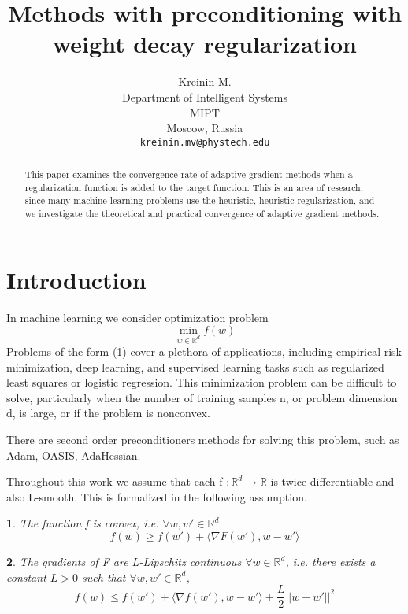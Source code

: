 \documentclass{article}
\title{Methods with preconditioning with weight decay regularization}
\author{ Kreinin M. \\
	Department of Intelligent Systems\\
	MIPT\\
	Moscow, Russia \\
	\texttt{kreinin.mv@phystech.edu} \\
}
\date{}
\makeatletter
\newtheorem*{assumption*}{\assumptionnumber}
\providecommand{\assumptionnumber}{}
\newenvironment{assumption}[2]
 {%
  \renewcommand{\assumptionnumber}{\textbf{Assumption} #1 ({#2})}%
  \begin{assumption*}%
  \protected@edef\@currentlabel{#1-#2}%
 }
 {%
  \end{assumption*}
 }
\makeatother
\begin{document}
\maketitle

\begin{abstract}
	This paper examines the convergence rate of adaptive gradient methods when a regularization function is added to the target function. This is an area of research, since many machine learning problems use the heuristic, heuristic regularization, and we investigate the theoretical and practical convergence of adaptive gradient methods.
\end{abstract}


\section{Introduction}
In machine learning we consider optimization problem
\begin{equation*}
	\min_{w \in \mathbb{R}^d} f(w)
\end{equation*}
Problems of the form (1) cover a plethora of applications, including empirical risk minimization,
deep learning, and supervised learning tasks such as regularized least squares or logistic regression. This minimization problem can be difficult to solve, particularly when the number of training
samples n, or problem dimension d, is large, or if the problem is nonconvex.

There are second order preconditioners methods for solving this problem, such as Adam, OASIS, AdaHessian. 

Throughout this work we assume that each f $:\mathbb{R}^d \rightarrow \mathbb{R}$ is twice differentiable and also L-smooth. This is formalized in the following assumption.

\begin{assumption}{1}{Convex}
	The function f is convex, i.e. $\forall w, w' \in \mathbb{R}^d$
	\begin{equation}
		f(w) \geq f(w') + \langle \nabla F(w'), w-w' \rangle
	\end{equation}
\end{assumption}

\begin{assumption}{2}{L-smoothness}
	The gradients of F are L-Lipschitz continuous $\forall w \in \mathbb{R}^d$, i.e. there exists a constant $L > 0$ such that $\forall w, w' \in \mathbb{R}^d$,
	\begin{equation*}
		f(w) \leq f(w') + \langle \nabla f(w'), w-w' \rangle + \frac{L}{2} ||w - w'||^2
	\end{equation*}
\end{assumption}
\end{document}
